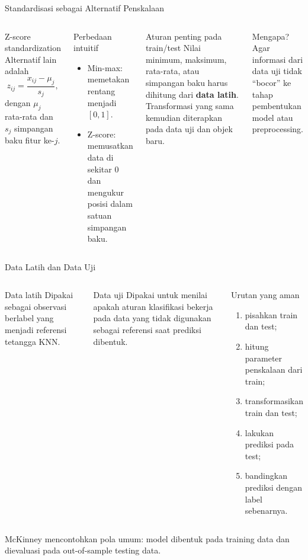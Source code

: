 \documentclass[aspectratio=169,11pt]{beamer}
\begin{document}
\begin{frame}{Standardisasi sebagai Alternatif Penskalaan}
\begin{columns}[T]
\begin{block}{Z-score standardization}
\small
Alternatif lain adalah
\[
z_{ij}=\frac{x_{ij}-\mu_j}{s_j},
\]
dengan $\mu_j$ rata-rata dan $s_j$ simpangan baku fitur ke-$j$.
\end{block}
\begin{block}{Perbedaan intuitif}
\small
\begin{itemize}
  \item Min-max: memetakan rentang menjadi $[0,1]$.
  \item Z-score: memusatkan data di sekitar 0 dan mengukur posisi dalam satuan simpangan baku.
\end{itemize}
\end{block}
\begin{alertblock}{Aturan penting pada train/test}
\small
Nilai minimum, maksimum, rata-rata, atau simpangan baku harus dihitung dari \textbf{data latih}. Transformasi yang sama kemudian diterapkan pada data uji dan objek baru.
\end{alertblock}
\begin{block}{Mengapa?}
\small
Agar informasi dari data uji tidak ``bocor'' ke tahap pembentukan model atau preprocessing.
\end{block}
\end{columns}
\end{frame}

\begin{frame}{Data Latih dan Data Uji}
\begin{columns}[T]
\begin{block}{Data latih}
\small
Dipakai sebagai observasi berlabel yang menjadi referensi tetangga KNN.
\end{block}
\begin{block}{Data uji}
\small
Dipakai untuk menilai apakah aturan klasifikasi bekerja pada data yang tidak digunakan sebagai referensi saat prediksi dibentuk.
\end{block}
\begin{alertblock}{Urutan yang aman}
\small
\begin{enumerate}
  \item pisahkan train dan test;
  \item hitung parameter penskalaan dari train;
  \item transformasikan train dan test;
  \item lakukan prediksi pada test;
  \item bandingkan prediksi dengan label sebenarnya.
\end{enumerate}
\end{alertblock}
\end{columns}
\vspace{1mm}
{\tiny McKinney mencontohkan pola umum: model dibentuk pada training data dan dievaluasi pada out-of-sample testing data.}
\end{frame}
\end{document}
